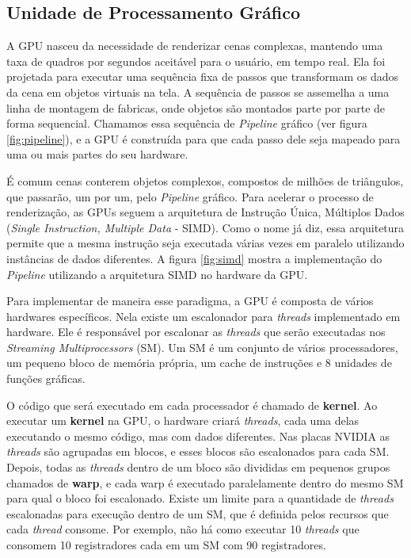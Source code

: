 \subsection{Unidade de Processamento Gráfico}\label{GPU}
    A GPU nasceu da necessidade de renderizar cenas complexas, mantendo uma taxa de quadros por segundos
aceitável para o usuário, em tempo real. Ela foi projetada para executar uma sequência fixa de passos que transformam
os dados da cena em objetos virtuais na tela. A sequência de passos se assemelha a uma linha de montagem de fabricas,
onde objetos são montados parte por parte de forma sequencial. Chamamos essa sequência de \textit{Pipeline} gráfico
(ver figura \ref{fig:pipeline}), e a GPU é construída para que cada passo dele seja mapeado para uma ou mais partes do
seu hardware.

    É comum cenas conterem objetos complexos, compostos de milhões de triângulos, que passarão, um por um, pelo
\textit{Pipeline} gráfico. Para acelerar o processo de renderização, as GPUs seguem a arquitetura de Instrução Única,
Múltiplos Dados (\textit{Single Instruction, Multiple Data} - SIMD). Como o nome já diz, essa arquitetura permite que
a mesma instrução seja executada várias vezes em paralelo utilizando instâncias de dados diferentes. A figura
\ref{fig:simd} mostra a implementação do \textit{Pipeline} utilizando a arquitetura SIMD no hardware da GPU.

    Para implementar de maneira esse paradigma, a GPU é composta de vários hardwares específicos. Nela existe um
escalonador para \textit{threads} implementado em hardware. Ele é responsável por escalonar as \textit{threads} que serão
executadas nos \textit{Streaming Multiprocessors} (SM). Um SM é um conjunto de vários processadores, um pequeno bloco de
memória própria, um cache de instruções e 8 unidades de funções gráficas.

    O código que será executado em cada processador é chamado de \textbf{kernel}. Ao executar um \textbf{kernel} na GPU, o
hardware criará \textit{threads}, cada uma delas executando o mesmo código, mas com dados diferentes. Nas placas NVIDIA as \textit{threads}
são agrupadas em blocos, e esses blocos são escalonados para cada SM. Depois, todas as \textit{threads} dentro de um bloco são
divididas em pequenos grupos chamados de \textbf{warp}, e cada warp é executado paralelamente dentro do
mesmo SM para qual o bloco foi escalonado. Existe um limite para a quantidade de \textit{threads} escalonadas para execução
dentro de um SM, que é definida pelos recursos que cada \textit{thread} consome. Por exemplo, não há como executar 10 \textit{threads}
que consomem 10 registradores cada em um SM com 90 registradores.


